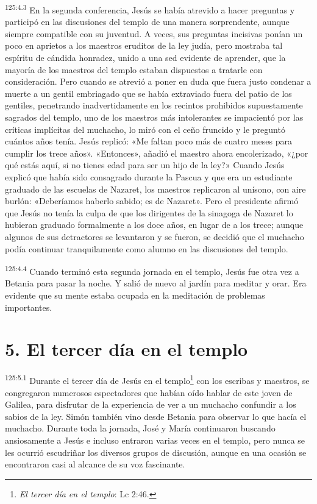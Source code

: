 \par
\textsuperscript{125:4.3} En la segunda conferencia, Jesús se había atrevido a hacer preguntas y participó en las discusiones del templo de una manera sorprendente, aunque siempre compatible con su juventud. A veces, sus preguntas incisivas ponían un poco en aprietos a los maestros eruditos de la ley judía, pero mostraba tal espíritu de cándida honradez, unido a una sed evidente de aprender, que la mayoría de los maestros del templo estaban dispuestos a tratarle con consideración. Pero cuando se atrevió a poner en duda que fuera justo condenar a muerte a un gentil embriagado que se había extraviado fuera del patio de los gentiles, penetrando inadvertidamente en los recintos prohibidos supuestamente sagrados del templo, uno de los maestros más intolerantes se impacientó por las críticas implícitas del muchacho, lo miró con el ceño fruncido y le preguntó cuántos años tenía. Jesús replicó: «Me faltan poco más de cuatro meses para cumplir los trece años». «Entonces», añadió el maestro ahora encolerizado, «¿por qué estás aquí, si no tienes edad para ser un hijo de la ley?» Cuando Jesús explicó que había sido consagrado durante la Pascua y que era un estudiante graduado de las escuelas de Nazaret, los maestros replicaron al unísono, con aire burlón: «Deberíamos haberlo sabido; es de Nazaret». Pero el presidente afirmó que Jesús no tenía la culpa de que los dirigentes de la sinagoga de Nazaret lo hubieran graduado formalmente a los doce años, en lugar de a los trece; aunque algunos de sus detractores se levantaron y se fueron, se decidió que el muchacho podía continuar tranquilamente como alumno en las discusiones del templo.

\par
\textsuperscript{125:4.4} Cuando terminó esta segunda jornada en el templo, Jesús fue otra vez a Betania para pasar la noche. Y salió de nuevo al jardín para meditar y orar. Era evidente que su mente estaba ocupada en la meditación de problemas importantes.

\section*{5. El tercer día en el templo}
\par
\textsuperscript{125:5.1} Durante el tercer día de Jesús en el templo\footnote{\textit{El tercer día en el templo}: Lc 2:46.} con los escribas y maestros, se congregaron numerosos espectadores que habían oído hablar de este joven de Galilea, para disfrutar de la experiencia de ver a un muchacho confundir a los sabios de la ley. Simón también vino desde Betania para observar lo que hacía el muchacho. Durante toda la jornada, José y María continuaron buscando ansiosamente a Jesús e incluso entraron varias veces en el templo, pero nunca se les ocurrió escudriñar los diversos grupos de discusión, aunque en una ocasión se encontraron casi al alcance de su voz fascinante.

